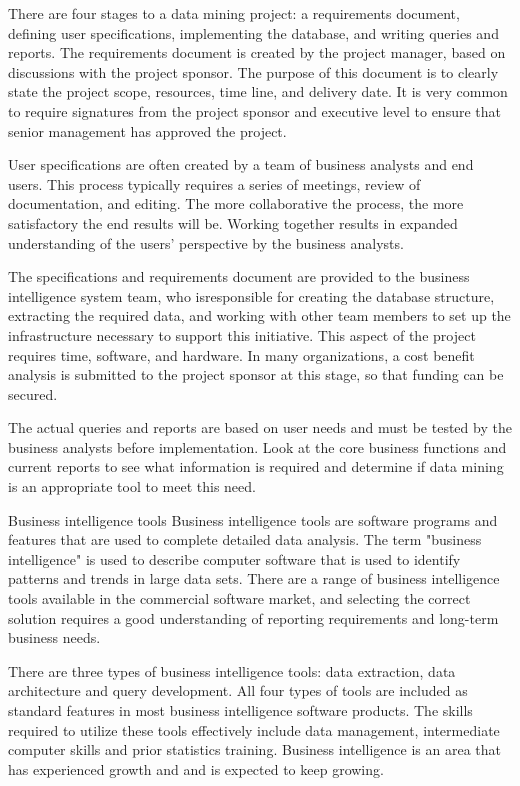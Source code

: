 There are four stages to a data mining project: a requirements document, defining user specifications, implementing the database, and writing queries and reports. The requirements document is created by the project manager, based on discussions with the project sponsor. The purpose of this document is to clearly state the project scope, resources, time line, and delivery date. It is very common to require signatures from the project sponsor and executive level to ensure that senior management has approved the project.

User specifications are often created by a team of business analysts and end users. This process typically requires a series of meetings, review of documentation, and editing. The more collaborative the process, the more satisfactory the end results will be. Working together results in expanded understanding of the users' perspective by the business analysts.

The specifications and requirements document are provided to the business intelligence system team, who isresponsible for creating the database structure, extracting the required data, and working with other team members to set up the infrastructure necessary to support this initiative. This aspect of the project requires time, software, and hardware. In many organizations, a cost benefit analysis is submitted to the project sponsor at this stage, so that funding can be secured.

The actual queries and reports are based on user needs and must be tested by the business analysts before implementation. Look at the core business functions and current reports to see what information is required and determine if data mining is an appropriate tool to meet this need.

Business intelligence tools
Business intelligence tools are software programs and features that are used to complete detailed data analysis. The term "business intelligence" is used to describe computer software that is used to identify patterns and trends in large data sets. There are a range of business intelligence tools available in the commercial software market, and selecting the correct solution requires a good understanding of reporting requirements and long-term business needs.

There are three types of business intelligence tools: data extraction, data architecture and query development. All four types of tools are included as standard features in most business intelligence software products. The skills required to utilize these tools effectively include data management, intermediate computer skills and prior statistics training. Business intelligence is an area that has experienced growth and and is expected to keep growing.

